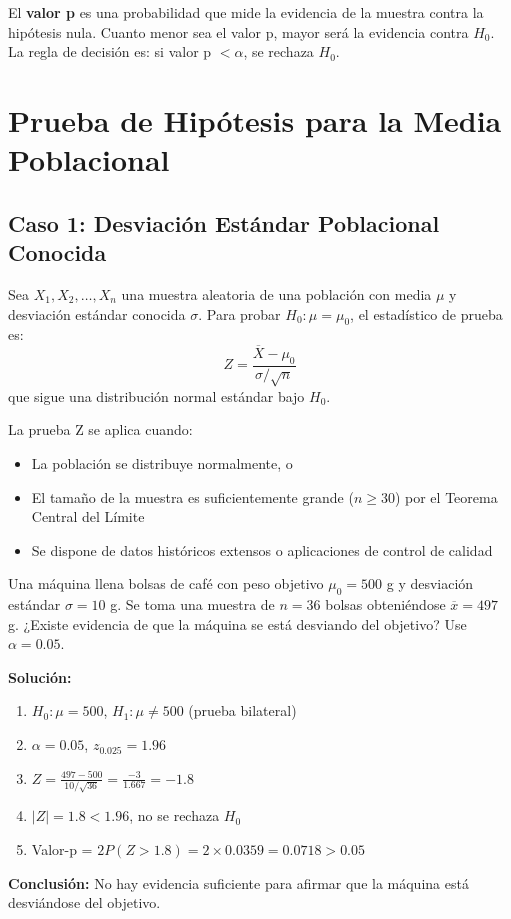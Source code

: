 \begin{definition}[Valor p]
El \textbf{valor p} es una probabilidad que mide la evidencia de la muestra contra la hipótesis nula. Cuanto menor sea el valor p, mayor será la evidencia contra $H_0$. La regla de decisión es: si valor p $< \alpha$, se rechaza $H_0$.
\end{definition}

\section{Prueba de Hipótesis para la Media Poblacional}

\subsection{Caso 1: Desviación Estándar Poblacional Conocida}

\begin{theorem}
Sea $X_1, X_2, \ldots, X_n$ una muestra aleatoria de una población con media $\mu$ y desviación estándar conocida $\sigma$. Para probar $H_0: \mu = \mu_0$, el estadístico de prueba es:
\[
Z = \frac{\overline{X} - \mu_0}{\sigma/\sqrt{n}}
\]
que sigue una distribución normal estándar bajo $H_0$.
\end{theorem}

\begin{remark}
La prueba Z se aplica cuando:
\begin{itemize}
    \item La población se distribuye normalmente, o
    \item El tamaño de la muestra es suficientemente grande ($n \geq 30$) por el Teorema Central del Límite
    \item Se dispone de datos históricos extensos o aplicaciones de control de calidad
\end{itemize}
\end{remark}

\begin{example}
Una máquina llena bolsas de café con peso objetivo $\mu_0 = 500$ g y desviación estándar $\sigma = 10$ g. Se toma una muestra de $n=36$ bolsas obteniéndose $\overline{x} = 497$ g. ¿Existe evidencia de que la máquina se está desviando del objetivo? Use $\alpha = 0.05$.

\textbf{Solución:}
\begin{enumerate}
    \item $H_0: \mu = 500$, $H_1: \mu \neq 500$ (prueba bilateral)
    \item $\alpha = 0.05$, $z_{0.025} = 1.96$
    \item $Z = \frac{497 - 500}{10/\sqrt{36}} = \frac{-3}{1.667} = -1.8$
    \item $|Z| = 1.8 < 1.96$, no se rechaza $H_0$
    \item Valor-p = $2P(Z > 1.8) = 2 \times 0.0359 = 0.0718 > 0.05$
\end{enumerate}
\textbf{Conclusión:} No hay evidencia suficiente para afirmar que la máquina está desviándose del objetivo.
\end{example}

